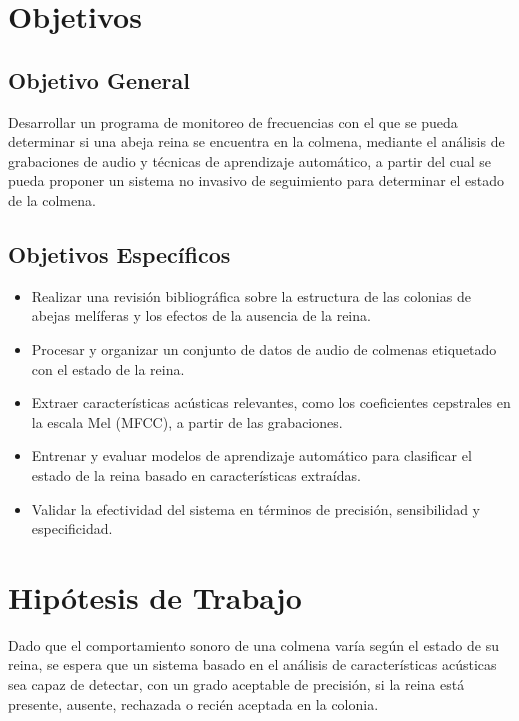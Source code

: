 \documentclass[12pt]{report}
\newenvironment{tightmulticols}{%
  \begin{multicols}{2}
  \setlength{\parskip}{0pt}
  \setlength{\parindent}{0em}
  \linespread{1}\selectfont
}{%
  \end{multicols}
}
\begin{document}
\begin{tightmulticols}

\section{Objetivos}

\subsection{Objetivo General}

\par Desarrollar un programa de monitoreo de frecuencias con el que se pueda determinar si una abeja reina se encuentra en la colmena, mediante el análisis de grabaciones de audio y técnicas de aprendizaje automático, a partir del cual se pueda proponer un sistema no invasivo de seguimiento para determinar el estado de la colmena.

\subsection{Objetivos Específicos}

\begin{itemize}
    \item[\ding{43}] Realizar una revisión bibliográfica sobre la estructura de las colonias de abejas melíferas y los efectos de la ausencia de la reina.
    \item[\ding{43}] Procesar y organizar un conjunto de datos de audio de colmenas etiquetado con el estado de la reina.
    \item[\ding{43}] Extraer características acústicas relevantes, como los coeficientes cepstrales en la escala Mel (MFCC), a partir de las grabaciones.
    \item[\ding{43}] Entrenar y evaluar modelos de aprendizaje automático para clasificar el estado de la reina basado en características extraídas.
    \item[\ding{43}] Validar la efectividad del sistema en términos de precisión, sensibilidad y especificidad.
\end{itemize}

\section{Hipótesis de Trabajo}

\par Dado que el comportamiento sonoro de una colmena varía según el estado de su reina, se espera que un sistema basado en el análisis de características acústicas sea capaz de detectar, con un grado aceptable de precisión, si la reina está presente, ausente, rechazada o recién aceptada en la colonia.

\end{tightmulticols}
\end{document}
